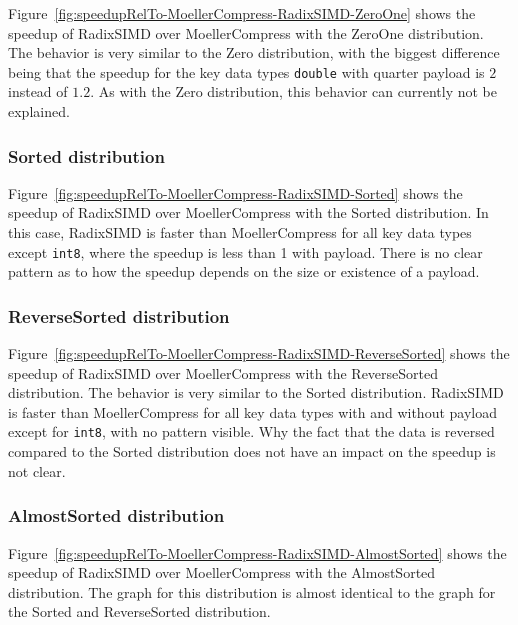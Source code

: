 \documentclass[12pt, a4paper, openright, twoside]{tiarbeit}
\begin{document}

Figure~\ref{fig:speedupRelTo-MoellerCompress-RadixSIMD-ZeroOne} shows the speedup of RadixSIMD
over MoellerCompress with the ZeroOne distribution. The behavior
is very similar to the Zero distribution, with the biggest difference being
that the speedup for the key data types \texttt{double} with quarter payload is
$2$ instead of $1.2$.
As with the Zero distribution, this behavior can currently not be explained.

\subsubsection*{Sorted distribution}


Figure~\ref{fig:speedupRelTo-MoellerCompress-RadixSIMD-Sorted} shows the speedup of RadixSIMD
over MoellerCompress with the Sorted distribution.
In this case, RadixSIMD is
faster than MoellerCompress for all key data types except \texttt{int8}, where
the speedup is less than 1 with payload.
There is no clear pattern as to how the speedup depends on the size
or existence of a payload.

\subsubsection*{ReverseSorted distribution}


Figure~\ref{fig:speedupRelTo-MoellerCompress-RadixSIMD-ReverseSorted} shows the speedup of RadixSIMD
over MoellerCompress with the ReverseSorted distribution.
The behavior
is very similar to the Sorted distribution. RadixSIMD is
faster than MoellerCompress for all key data types with and without payload except
for \texttt{int8}, with no pattern visible.
Why the fact that the data is reversed compared to the Sorted distribution
does not have an impact on the speedup is not clear.

\subsubsection*{AlmostSorted distribution}


Figure~\ref{fig:speedupRelTo-MoellerCompress-RadixSIMD-AlmostSorted} shows the speedup of RadixSIMD
over MoellerCompress with the AlmostSorted distribution.
The graph for this distribution is almost identical to the graph
for the Sorted and ReverseSorted distribution.
\end{document}
